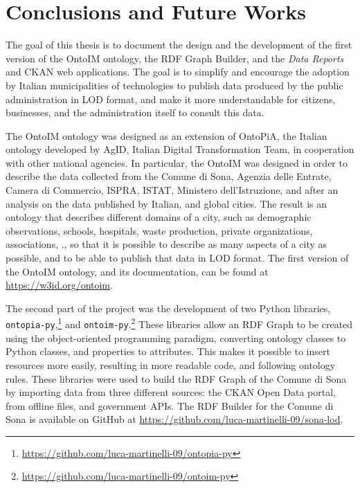 \chapter{Conclusions and Future Works}
\label{chp:conclusions}

The goal of this thesis is to document the design and the development of the first version of the \ac{OntoIM} ontology, the \ac{RDF} Graph Builder, and the \textit{Data Reports} and CKAN web applications. The goal is to simplify and encourage the adoption by Italian municipalities of technologies to publish data produced by the public administration in \acl{LOD} format, and make it more understandable for citizens, businesses, and the administration itself to consult this data.

The \ac{OntoIM} ontology was designed as an extension of OntoPiA, the Italian ontology developed by \ac{AgID}, Italian Digital Transformation Team, in cooperation with other national agencies. In particular, the \ac{OntoIM} was designed in order to describe the data collected from the Comune di Sona, Agenzia delle Entrate, Camera di Commercio, ISPRA, ISTAT, Ministero dell'Istruzione, and after an analysis on the data published by Italian, and global cities. The result is an ontology that describes different domains of a city, such as demographic observations, schools, hospitals, waste production, private organizations, associations, \etc., so that it is possible to describe as many aspects of a city as possible, and to be able to publish that data in \acl{LOD} format. The first version of the \ac{OntoIM} ontology, and its documentation, can be found at \url{https://w3id.org/ontoim}.

The second part of the project was the development of two Python libraries, \verb#ontopia-py#,\footnote{\url{https://github.com/luca-martinelli-09/ontopia-py}} and \verb#ontoim-py#.\footnote{\url{https://github.com/luca-martinelli-09/ontoim-py}} These libraries allow an \ac{RDF} Graph to be created using the object-oriented programming paradigm, converting ontology classes to Python classes, and properties to attributes. This makes it possible to insert resources more easily, resulting in more readable code, and following ontology rules. These libraries were used to build the \ac{RDF} Graph of the Comune di Sona by importing data from three different sources: the CKAN Open Data portal, from offline files, and government \acsp{API}. The \ac{RDF} Builder for the Comune di Sona is available on GitHub at \url{https://github.com/luca-martinelli-09/sona-lod}.

